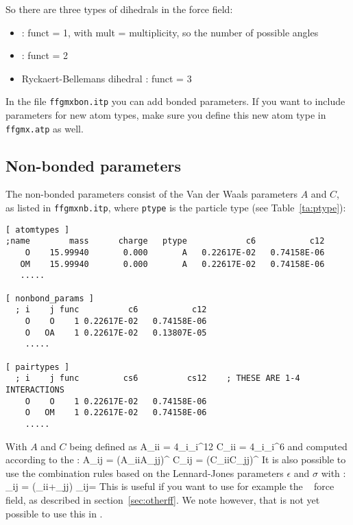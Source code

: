 So there are three types of dihedrals in the {\gromacs} force field:
\begin{itemize}
\item {} : funct = 1, with mult = multiplicity, so the
                                   number of possible angles
\item {} : funct = 2
\item Ryckaert-Bellemans dihedral : funct = 3
\end{itemize}
In the file \verb'ffgmxbon.itp' you can add bonded parameters. If you
want to include parameters for new atom types, make sure you define
this new atom type in \verb'ffgmx.atp' as well.

\subsection{Non-bonded parameters}
\label{subsec:nbpar}
The non-bonded parameters consist of the Van der Waals parameters
$A$ and $C$, as listed in \verb'ffgmxnb.itp', where {\tt ptype} is the
particle type (see Table~\ref{ta:ptype}):
{\small
\begin{verbatim}
[ atomtypes ]
;name        mass      charge   ptype            c6           c12
    O    15.99940       0.000       A   0.22617E-02   0.74158E-06
   OM    15.99940       0.000       A   0.22617E-02   0.74158E-06
   .....

[ nonbond_params ]
  ; i    j func          c6           c12
    O    O    1 0.22617E-02   0.74158E-06
    O   OA    1 0.22617E-02   0.13807E-05
    .....

[ pairtypes ]
  ; i    j func         cs6          cs12    ; THESE ARE 1-4 INTERACTIONS
    O    O    1 0.22617E-02   0.74158E-06
    O   OM    1 0.22617E-02   0.74158E-06
    .....
\end{verbatim}}
With $A$ and $C$ being defined as
\beq
	A_{ii} = 4\epsilon_i\sigma_i^{12}
\eeq
\beq
	C_{ii} = 4\epsilon_i\sigma_i^{6}
\eeq
and computed according to the  :
\beq
	A_{ij} = (A_{ii}A_{jj})^{}
\eeq
\beq
	C_{ij} = (C_{ii}C_{jj})^{}
\eeq
It is also possible to use the combination rules based on the
Lennard-Jones parameters $\epsilon$ and $\sigma$ with : 
\beq
 	\sigma_{ij} = (\sigma_{ii}+\sigma_{jj})
\eeq
\beq
 	\epsilon_{ij}=
\eeq
This is useful if you want to use for example the
~\cite{Jorgensen88} force field, as described in
section~\ref{sec:otherff}. We note however, that is not yet possible
to use this in {\gromacs} {\gmxver}.

